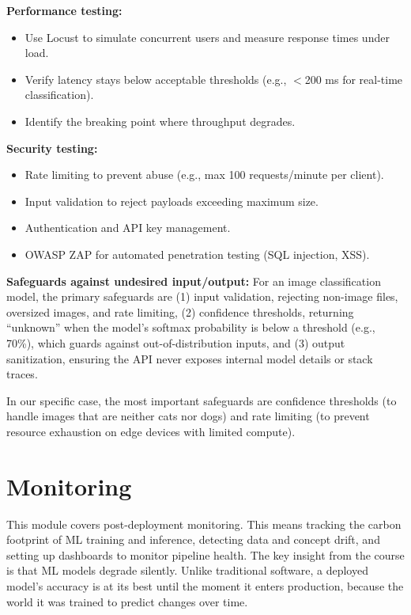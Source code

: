 \documentclass[10pt,twocolumn,letterpaper]{article}
\begin{document}
\textbf{Performance testing:}
\begin{itemize}
    \item Use Locust to simulate concurrent users and measure response times under load.
    \item Verify latency stays below acceptable thresholds (e.g., $<$200 ms for real-time classification).
    \item Identify the breaking point where throughput degrades.
\end{itemize}

\textbf{Security testing:}
\begin{itemize}
    \item Rate limiting to prevent abuse (e.g., max 100 requests/minute per client).
    \item Input validation to reject payloads exceeding maximum size.
    \item Authentication and API key management.
    \item OWASP ZAP for automated penetration testing (SQL injection, XSS).
\end{itemize}

\textbf{Safeguards against undesired input/output:}
For an image classification model, the primary safeguards are (1) input validation, rejecting non-image files, oversized images, and rate limiting, (2) confidence thresholds, returning ``unknown'' when the model's softmax probability is below a threshold (e.g., 70\%), which guards against out-of-distribution inputs, and (3) output sanitization, ensuring the API never exposes internal model details or stack traces.

In our specific case, the most important safeguards are confidence thresholds (to handle images that are neither cats nor dogs) and rate limiting (to prevent resource exhaustion on edge devices with limited compute).

\section{Monitoring}\label{sec:monitoring}

This module covers post-deployment monitoring. This means tracking the carbon footprint of ML training and inference, detecting data and concept drift, and setting up dashboards to monitor pipeline health. The key insight from the course is that ML models degrade silently. Unlike traditional software, a deployed model's accuracy is at its best until the moment it enters production, because the world it was trained to predict changes over time.
\end{document}
